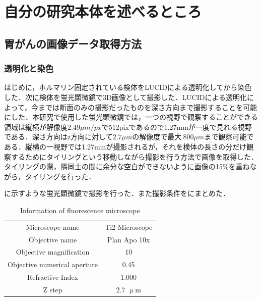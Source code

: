 \chapter{自分の研究本体を述べるところ}

\section{胃がんの画像データ取得方法}

\subsection{透明化と染色}
はじめに，ホルマリン固定されている検体をLUCIDによる透明化してから染色した．次に検体を蛍光顕微鏡で3D画像として撮影した．LUCIDによる透明化によって，今までは断面のみの撮影だったものを深さ方向まで撮影することを可能にした．本研究で使用した蛍光顕微鏡では，一つの視野で観察することができる領域は縦横が解像度$ 2.49\mu m/px$で512pixであるので1.27mmが一度で見れる視野である．深さ方向はz方向に対して$2.7 \mu m$の解像度で最大$~800\mu m$まで観察可能である．縦横の一視野では1.27mmが撮影されるが，それを検体の長さの分だけ観察するためにタイリングという移動しながら撮影を行う方法で画像を取得した．タイリングの際，隣同士の間に余分な空白ができないように画像の15\%を重ねながら，タイリングを行った．

に示すような蛍光顕微鏡で撮影を行った．また撮影条件をにまとめた．

\begin{table}[H]
	\centering
	\caption{Information of fluorescence microscope}
	\label{tab:蛍光顕微鏡}
	\begin{tabular}{cc}\toprule
		Microscope name & Ti2 Microscope \\ 
		Objective name & Plan Apo 10x \\ 
		Objective magnification & 10 \\ 
		Objective numerical aperture & 0.45 \\ 
		Refractive Index & 1.000 \\
		Z step & 2.7 $\upmu$m \\ \bottomrule
	\end{tabular} 
\end{table}

